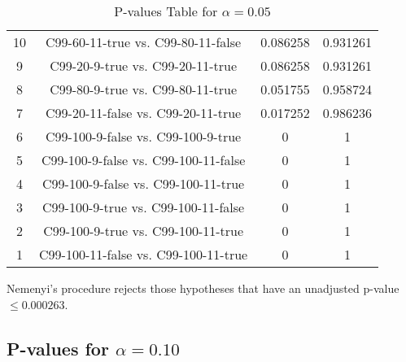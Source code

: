 \documentclass[a4paper,10pt]{article}
\begin{document}
\begin{landscape}
\begin{table}[!htp]
\begin{tabular}{cccc}
10&C99-60-11-true vs. C99-80-11-false&0.086258&0.931261\\
9&C99-20-9-true vs. C99-20-11-true&0.086258&0.931261\\
8&C99-80-9-true vs. C99-80-11-true&0.051755&0.958724\\
7&C99-20-11-false vs. C99-20-11-true&0.017252&0.986236\\
6&C99-100-9-false vs. C99-100-9-true&0&1\\
5&C99-100-9-false vs. C99-100-11-false&0&1\\
4&C99-100-9-false vs. C99-100-11-true&0&1\\
3&C99-100-9-true vs. C99-100-11-false&0&1\\
2&C99-100-9-true vs. C99-100-11-true&0&1\\
1&C99-100-11-false vs. C99-100-11-true&0&1\\
\hline
\end{tabular}
\caption{P-values Table for $\alpha=0.05$}
\end{table}Nemenyi's procedure rejects those hypotheses that have an unadjusted p-value $\le0.000263$.

\pagebreak

\subsection{P-values for $\alpha=0.10$}


\end{landscape}
\end{document}
